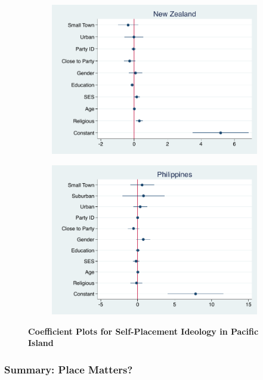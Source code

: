 \documentclass[12pt, titlepage]{article}
\newcommand\tb{\textbf}
\begin{document}
\begin{figure}[H]
	\centering
	\begin{subfigure}[b]{0.475\textwidth}
		\centering
		\includegraphics[width=\textwidth]{IdeologyCoef/NewZealand}
	\end{subfigure}
	\hfill
	\begin{subfigure}[b]{0.475\textwidth}  
		\centering 
		\includegraphics[width=\textwidth]{IdeologyCoef/Philippines}
	\end{subfigure}
	\caption[ \tb{Self-Placement Ideology - Pacific Islands} ]
	{\tb {Coefficient Plots for Self-Placement Ideology in Pacific Island} }
	\label{Pacific}
\end{figure}

\subsubsection{Summary: Place Matters?}
\end{document}
